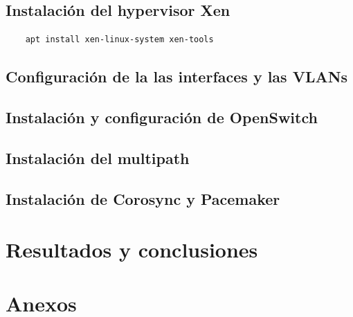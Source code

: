 \documentclass[12pt,a4paper,titlepage,twoside]{report}
\begin{document}
\section{Instalación del hypervisor Xen}
\begin{verbatim}
	apt install xen-linux-system xen-tools
\end{verbatim}

\section{Configuración de la las interfaces y las VLANs}
\section{Instalación y configuración de OpenSwitch}
\section{Instalación del multipath}
\section{Instalación de Corosync y Pacemaker}

\chapter{Resultados y conclusiones}
\chapter{Anexos}

\nocite{*}
\printbibliography
\end{document}

